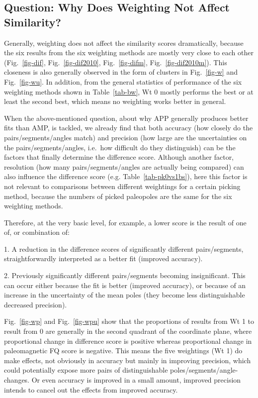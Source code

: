 \subsection{Question: Why Does Weighting Not Affect Similarity?}

Generally, weighting does not affect the similarity scores dramatically, because
the six results from the six weighting methods are mostly very close to each
other (Fig.~\ref{fig-dif}, Fig.~\ref{fig-dif2010}, Fig.~\ref{fig-difm},
Fig.~\ref{fig-dif2010m}). This closeness is also generally observed in the form
of clusters in Fig.~\ref{fig-w} and Fig.~\ref{fig-wu}. In addition, from the
general statistics of performance of the six weighting methods shown in
Table~\ref{tab-bw}, Wt 0 mostly performs the best or at least the second best,
which means no weighting works better in general.

When the above-mentioned question, about why APP generally produces better fits
than AMP, is tackled, we already find that both accuracy (how closely do the
pairs/segments/angles match) and precision (how large are the uncertainties on
the pairs/segments/angles, i.e.\ how difficult do they distinguish) can be the
factors that finally determine the difference score. Although another factor,
resolution (how many pairs/segments/angles are actually being compared) can
also influence the difference score (e.g. Table~\ref{tab-pk0vs1bs}), here this
factor is not relevant to comparisons between different weightings for a certain
picking method, because the numbers of picked paleopoles are the same for the
six weighting methods.

Therefore, at the very basic level, for example, a lower score is the result of
one of, or combination of:

1. A reduction in the difference scores of significantly different
pairs/segments, straightforwardly interpreted as a better fit (improved
accuracy).

2. Previously significantly different pairs/segments becoming insignificant.
This can occur either because the fit is better (improved accuracy), or because
of an increase in the uncertainty of the mean poles (they become less
distinguishable \textemdash{} decreased precision).

Fig.~\ref{fig-wp} and Fig.~\ref{fig-wpu} show that the proportions of results
from Wt 1 to result from 0 are generally in the second quadrant of
the coordinate plane, where proportional change in difference score is positive
whereas proportional change in paleomagnetic FQ score is negative. This means
the five weightings (Wt 1) do make effects, not obviously in
accuracy but mainly in improving precision, which could potentially expose more
pairs of distinguishable poles/segments/angle-changes. Or even accuracy is
improved in a small amount, improved precision intends to cancel out the effects
from improved accuracy.

